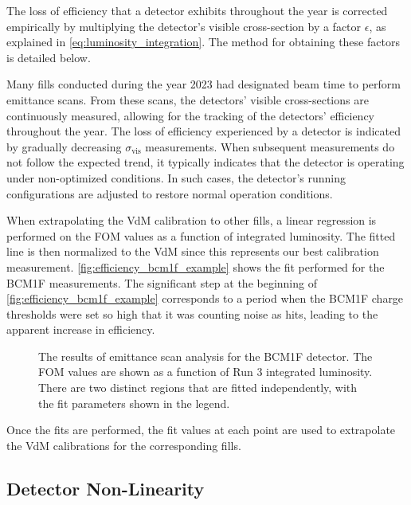 
The loss of efficiency that a detector exhibits throughout the year is corrected empirically by multiplying the detector's visible cross-section by a factor \(\epsilon\), as explained in \autoref{eq:luminosity_integration}. The method for obtaining these factors is detailed below.

Many fills conducted during the year 2023 had designated beam time to perform emittance scans. From these scans, the detectors' visible cross-sections are continuously measured, allowing for the tracking of the detectors' efficiency throughout the year. The loss of efficiency experienced by a detector is indicated by gradually decreasing \(\sigma_{\mathrm{vis}}\) measurements. When subsequent measurements do not follow the expected trend, it typically indicates that the detector is operating under non-optimized conditions. In such cases, the detector's running configurations are adjusted to restore normal operation conditions.

When extrapolating the VdM calibration to other fills, a linear regression is performed on the FOM values as a function of integrated luminosity. The fitted line is then normalized to the VdM since this represents our best calibration measurement. \autoref{fig:efficiency_bcm1f_example} shows the fit performed for the BCM1F measurements. The significant step at the beginning of \autoref{fig:efficiency_bcm1f_example} corresponds to a period when the BCM1F charge thresholds were set so high that it was counting noise as hits, leading to the apparent increase in efficiency.

\begin{figure}[!htb]
	\centering
	\caption{The results of emittance scan analysis for the BCM1F detector. The FOM values are shown as a function of Run 3 integrated luminosity. There are two distinct regions that are fitted independently, with the fit parameters shown in the legend.}
	\label{fig:efficiency_bcm1f_example}
\end{figure}

Once the fits are performed, the fit values at each point are used to extrapolate the VdM calibrations for the corresponding fills.

\subsection{Detector Non-Linearity}
\label{subsec:detector_non_linearity}

